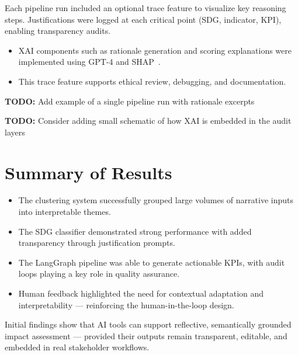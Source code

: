 Each pipeline run included an optional trace feature to visualize key reasoning steps.
Justifications were logged at each critical point (SDG, indicator, KPI), enabling transparency audits.

\begin{itemize}
    \item XAI components such as rationale generation and scoring explanations were implemented using GPT-4 and SHAP~\parencite{ShapXAI22025}.
    \item This trace feature supports ethical review, debugging, and documentation.
\end{itemize}

\textbf{TODO:} Add example of a single pipeline run with rationale excerpts

\textbf{TODO:} Consider adding small schematic of how XAI is embedded in the audit layers

\section{Summary of Results}\label{sec:results-summary}

\begin{itemize}
    \item The clustering system successfully grouped large volumes of narrative inputs into interpretable themes.
    \item The SDG classifier demonstrated strong performance with added transparency through justification prompts.
    \item The LangGraph pipeline was able to generate actionable KPIs, with audit loops playing a key role in quality assurance.
    \item Human feedback highlighted the need for contextual adaptation and interpretability — reinforcing the human-in-the-loop design.
\end{itemize}

Initial findings show that AI tools can support reflective, semantically grounded impact assessment — provided their outputs remain transparent, editable, and embedded in real stakeholder workflows.